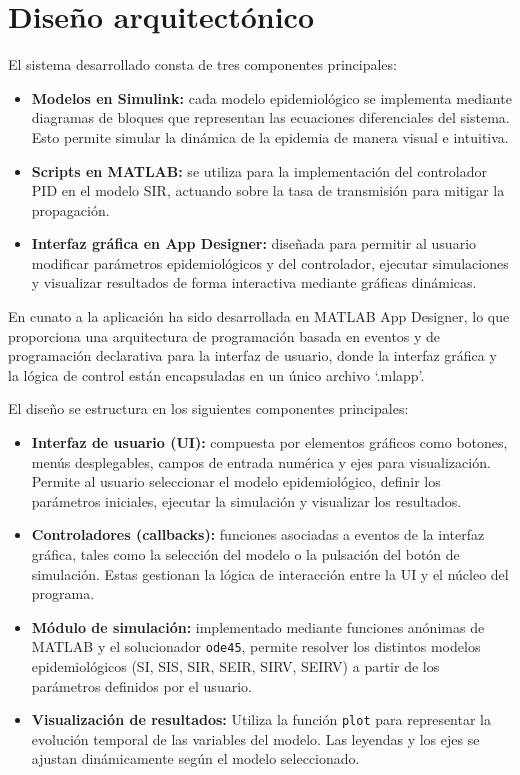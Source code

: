 \section{Diseño arquitectónico}
El sistema desarrollado consta de tres componentes principales:

\begin{itemize}
    \item \textbf{Modelos en Simulink:} cada modelo epidemiológico se implementa mediante diagramas de bloques que representan las ecuaciones diferenciales del sistema. Esto permite simular la dinámica de la epidemia de manera visual e intuitiva.

    \item \textbf{Scripts en MATLAB:} se utiliza para la implementación del controlador PID en el modelo SIR, actuando sobre la tasa de transmisión para mitigar la propagación.

    \item \textbf{Interfaz gráfica en App Designer:} diseñada para permitir al usuario modificar parámetros epidemiológicos y del controlador, ejecutar simulaciones y visualizar resultados de forma interactiva mediante gráficas dinámicas.
\end{itemize}



En cunato a la aplicación ha sido desarrollada en MATLAB App Designer, lo que proporciona una arquitectura de programación basada en eventos y de programación declarativa para la interfaz de usuario, donde la interfaz gráfica y la lógica de control están encapsuladas en un único archivo `.mlapp'.

El diseño se estructura en los siguientes componentes principales:

\begin{itemize}
    \item \textbf{Interfaz de usuario (UI):} compuesta por elementos gráficos como botones, menús desplegables, campos de entrada numérica y ejes para visualización. Permite al usuario seleccionar el modelo epidemiológico, definir los parámetros iniciales, ejecutar la simulación y visualizar los resultados.
    
    \item \textbf{Controladores (callbacks):} funciones asociadas a eventos de la interfaz gráfica, tales como la selección del modelo o la pulsación del botón de simulación. Estas gestionan la lógica de interacción entre la UI y el núcleo del programa.
    
    \item \textbf{Módulo de simulación:} implementado mediante funciones anónimas de MATLAB y el solucionador \texttt{ode45}, permite resolver los distintos modelos epidemiológicos (SI, SIS, SIR, SEIR, SIRV, SEIRV) a partir de los parámetros definidos por el usuario.
    
    \item \textbf{Visualización de resultados:} Utiliza la función \texttt{plot} para representar la evolución temporal de las variables del modelo. Las leyendas y los ejes se ajustan dinámicamente según el modelo seleccionado.
\end{itemize}


